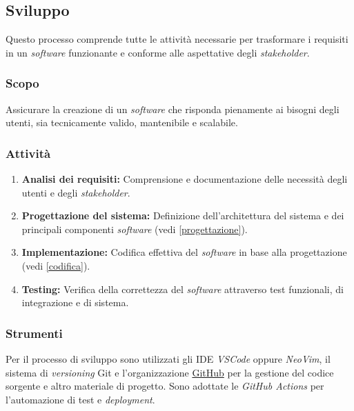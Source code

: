 \subsection{Sviluppo}

Questo processo comprende tutte le attività necessarie per trasformare i
requisiti in un \textit{software} funzionante e conforme alle aspettative degli
\textit{stakeholder}.

\subsubsection{Scopo}
Assicurare la creazione di un \textit{software} che risponda pienamente ai
bisogni degli utenti, sia tecnicamente valido, mantenibile e scalabile.

\subsubsection{Attività}
\begin{enumerate}
	\item \textbf{Analisi dei requisiti:} Comprensione e documentazione delle
	      necessità degli utenti e degli \textit{stakeholder}.
	\item \textbf{Progettazione del sistema:} Definizione dell'architettura del
	      sistema e dei principali componenti \textit{software} (vedi
	      \cref{progettazione}).
	\item \textbf{Implementazione:} Codifica effettiva del \textit{software} in
	      base alla progettazione (vedi \cref{codifica}).
	\item \textbf{Testing:} Verifica della correttezza del \textit{software}
	      attraverso test funzionali, di integrazione e di sistema.
\end{enumerate}

\subsubsection{Strumenti}
Per il processo di sviluppo sono utilizzati gli IDE \textit{VSCode} oppure
\textit{NeoVim}, il sistema di \textit{versioning} Git e l'organizzazione
\href{https://GitHub\g.com/Project-SWEnergy}{GitHub\g} per la gestione del codice
sorgente e altro materiale di progetto. Sono adottate le \textit{GitHub Actions}
per l'automazione di test e \textit{deployment}.
